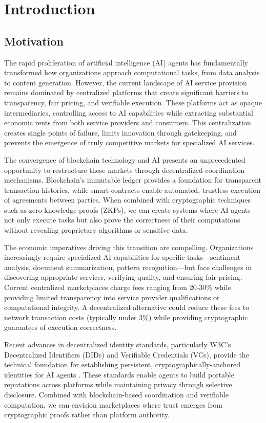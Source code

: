 ﻿\chapter{Introduction}
\label{chap:introduction}

\section{Motivation}

The rapid proliferation of artificial intelligence (AI) agents has fundamentally transformed how organizations approach computational tasks, from data analysis to content generation. However, the current landscape of AI service provision remains dominated by centralized platforms that create significant barriers to transparency, fair pricing, and verifiable execution. These platforms act as opaque intermediaries, controlling access to AI capabilities while extracting substantial economic rents from both service providers and consumers. This centralization creates single points of failure, limits innovation through gatekeeping, and prevents the emergence of truly competitive markets for specialized AI services.

The convergence of blockchain technology and AI presents an unprecedented opportunity to restructure these markets through decentralized coordination mechanisms. Blockchain's immutable ledger provides a foundation for transparent transaction histories, while smart contracts enable automated, trustless execution of agreements between parties. When combined with cryptographic techniques such as zero-knowledge proofs (ZKPs), we can create systems where AI agents not only execute tasks but also prove the correctness of their computations without revealing proprietary algorithms or sensitive data.

The economic imperatives driving this transition are compelling. Organizations increasingly require specialized AI capabilities for specific tasks—sentiment analysis, document summarization, pattern recognition—but face challenges in discovering appropriate services, verifying quality, and ensuring fair pricing. Current centralized marketplaces charge fees ranging from 20-30\% while providing limited transparency into service provider qualifications or computational integrity. A decentralized alternative could reduce these fees to network transaction costs (typically under 3\%) while providing cryptographic guarantees of execution correctness.

Recent advances in decentralized identity standards, particularly W3C's Decentralized Identifiers (DIDs) and Verifiable Credentials (VCs), provide the technical foundation for establishing persistent, cryptographically-anchored identities for AI agents \citep{w3c-did-v1,w3c-vc-2}. These standards enable agents to build portable reputations across platforms while maintaining privacy through selective disclosure. Combined with blockchain-based coordination and verifiable computation, we can envision marketplaces where trust emerges from cryptographic proofs rather than platform authority.

